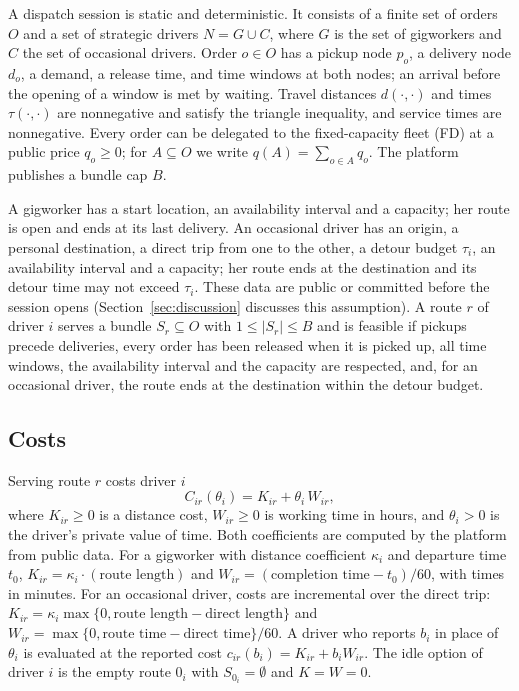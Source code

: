 \documentclass[review,12pt]{elsarticle}
\theoremstyle{definition}
\theoremstyle{remark}
\begin{document}
A dispatch session is static and deterministic. It consists of a finite set
of orders $O$ and a set of strategic drivers $N=G\cup C$, where $G$ is the
set of gigworkers and $C$ the set of occasional drivers. Order $o\in O$ has
a pickup node $p_o$, a delivery node $d_o$, a demand, a release time, and
time windows at both nodes; an arrival before the opening of a window is
met by waiting. Travel distances $d(\cdot,\cdot)$ and times
$\tau(\cdot,\cdot)$ are nonnegative and satisfy the triangle inequality,
and service times are nonnegative. Every order can be delegated to the
fixed-capacity fleet (FD) at a public price $q_o\ge 0$; for $A\subseteq O$
we write $q(A)=\sum_{o\in A}q_o$. The platform publishes a bundle cap $B$.

A gigworker has a start location, an availability interval and a capacity;
her route is open and ends at its last delivery. An occasional driver has an
origin, a personal destination, a direct trip from one to the other, a
detour budget $\tau_i$, an availability interval and a capacity; her route
ends at the destination and its detour time may not exceed $\tau_i$. These
data are public or committed before the session opens
(Section~\ref{sec:discussion} discusses this assumption). A route $r$ of
driver $i$ serves a bundle $S_r\subseteq O$ with $1\le|S_r|\le B$ and is
feasible if pickups precede deliveries, every order has been released when
it is picked up, all time windows, the availability interval and the
capacity are respected, and, for an occasional driver, the route ends at
the destination within the detour budget.

\subsection{Costs}

Serving route $r$ costs driver $i$
\begin{equation}
  C_{ir}(\theta_i)=K_{ir}+\theta_i\,W_{ir},
  \label{eq:cost}
\end{equation}
where $K_{ir}\ge 0$ is a distance cost, $W_{ir}\ge 0$ is working time in
hours, and $\theta_i>0$ is the driver's private value of time. Both
coefficients are computed by the platform from public data. For a gigworker
with distance coefficient $\kappa_i$ and departure time $t_0$,
$K_{ir}=\kappa_i\cdot(\text{route length})$ and
$W_{ir}=(\text{completion time}-t_0)/60$, with times in minutes. For an
occasional driver, costs are incremental over the direct trip:
$K_{ir}=\kappa_i\max\{0,\text{route length}-\text{direct length}\}$ and
$W_{ir}=\max\{0,\text{route time}-\text{direct time}\}/60$. A driver who
reports $b_i$ in place of $\theta_i$ is evaluated at the reported cost
$c_{ir}(b_i)=K_{ir}+b_i W_{ir}$. The idle option of driver $i$ is the empty
route $0_i$ with $S_{0_i}=\emptyset$ and $K=W=0$.
\end{document}
